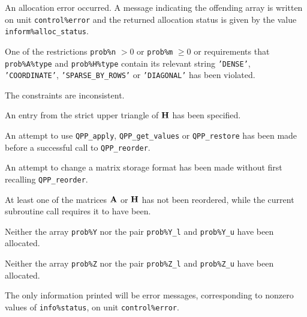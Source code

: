 \documentclass{galahad}
\newcommand{\packagename}{QPP}
\begin{document}
\begin{description}

 An allocation error occurred.
A message indicating the offending
 array is written on unit {\tt control\%error} and the returned allocation
 status is given by the value {\tt inform\%alloc\_status}.

 One of the restrictions
{\tt prob\%n} $> 0$ or {\tt prob\%m} $\geq  0$
    or requirements that {\tt prob\%A\%type}
    and {\tt prob\%H\%type} contain its relevant string
    {\tt 'DENSE'}, {\tt 'COORDINATE'}, {\tt 'SPARSE\_BY\_ROWS'}
    or {\tt 'DIAGONAL'}
    has been violated.


 The constraints are inconsistent.

 An entry from the strict upper triangle of ${\mathbf{H}}$
 has been specified.

 An attempt to use
{\tt \packagename\_apply}, {\tt \packagename\_get\_values}
or {\tt \packagename\_restore}
has been made before a successful call to {\tt \packagename\_reorder}.

 An attempt to change a matrix storage format has been made
without first recalling {\tt \packagename\_reorder}.

 At least one of the matrices ${\mathbf{A}}$ or ${\mathbf{H}}$ has not been reordered,
while the current subroutine call requires it to have been.

 Neither the array {\tt prob\%Y} nor the pair {\tt prob\%Y\_l} and
{\tt prob\%Y\_u} have been allocated.

 Neither the array {\tt prob\%Z} nor the pair {\tt prob\%Z\_l} and
{\tt prob\%Z\_u} have been allocated.

\end{description}


\galinfo
The only information printed will be error messages, corresponding to
nonzero values of {\tt info\%status}, on unit {\tt control\%error}.

\end{document}
